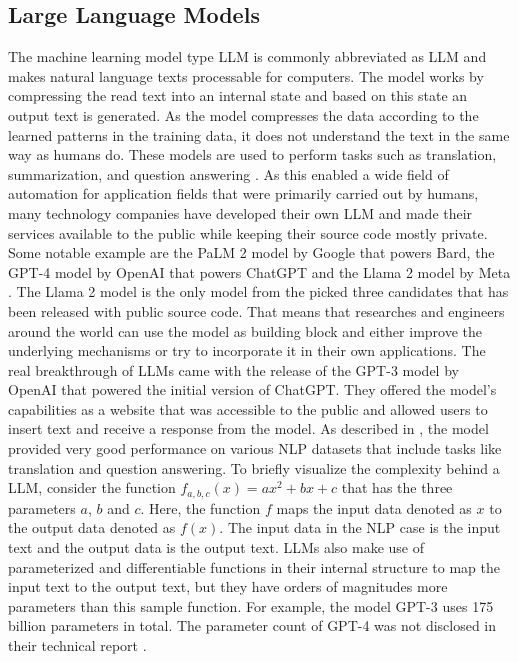 \documentclass[draft,final]{thesisclass} %
\begin{document}
\subsection{Large Language Models}
The machine learning model type \gls{LLM} is commonly abbreviated as \acs{LLM} and makes natural language texts processable for computers.
The model works by compressing the read text into an internal state and based on this state an output text is generated.
As the model compresses the data according to the learned patterns in the training data, it does not understand the text in the same way as humans do.
These models are used to perform tasks such as translation, summarization, and question answering \cite[1]{llm_literature_review}.
As this enabled a wide field of automation for application fields that were primarily carried out by humans, many technology companies have developed their own \acs{LLM} and made their services available to the public while keeping their source code mostly private.
Some notable example are the PaLM 2 model by Google \cite{palm2} that powers Bard, the GPT-4 model by OpenAI \cite{gpt4} that powers ChatGPT and the Llama 2 model by Meta \cite{llama2}.
The Llama 2 model is the only model from the picked three candidates that has been released with public source code.
That means that researches and engineers around the world can use the model as building block and either improve the underlying mechanisms or try to incorporate it in their own applications.
The real breakthrough of \acs{LLM}s came with the release of the GPT-3 model by OpenAI \cite{gpt3} that powered the initial version of ChatGPT.
They offered the model's capabilities as a website that was accessible to the public and allowed users to insert text and receive a response from the model.
As described in \cite[1]{gpt3}, the model provided very good performance on various \acs{NLP} datasets that include tasks like translation and question answering.
To briefly visualize the complexity behind a \acs{LLM}, consider the function $f_{a,b,c}(x) = ax^2+bx+c$ that has the three parameters $a$, $b$ and $c$.
Here, the function $f$ maps the input data denoted as $x$ to the output data denoted as $f(x)$.
The input data in the \acs{NLP} case is the input text and the output data is the output text.
\acs{LLM}s also make use of parameterized and differentiable functions in their internal structure to map the input text to the output text, but they have orders of magnitudes more parameters than this sample function.
For example, the model GPT-3 uses 175 billion parameters \cite[1]{gpt3} in total. The parameter count of GPT-4 was not disclosed in their technical report \cite{gpt4}.
\end{document}
